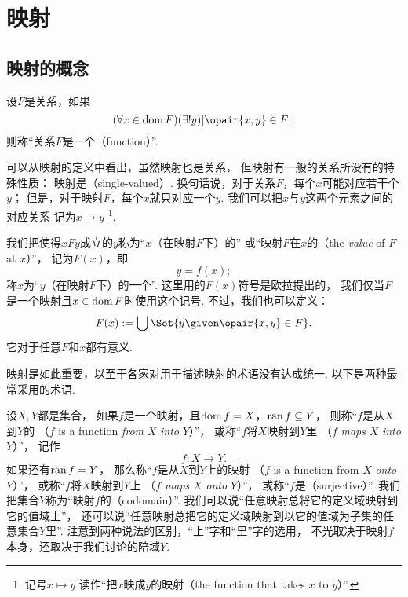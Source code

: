 \section{映射}
\subsection{映射的概念}
\begin{definition}
设\(F\)是关系，如果\[
	(\forall x \in \dom F)(\exists! y)[\opair{x,y} \in F],
\]
则称“关系\(F\)是一个（function）”.
\end{definition}
可以从映射的定义中看出，虽然映射也是关系，
但映射有一般的关系所没有的特殊性质：
映射是（single-valued）.
换句话说，对于关系\(F\)，每个\(x\)可能对应若干个\(y\)；
但是，对于映射\(F\)，每个\(x\)就只对应一个\(y\).
我们可以把\(x\)与\(y\)这两个元素之间的对应关系
记为\(x \mapsto y\) \footnote{
	记号\(x \mapsto y\)
	读作“把\(x\)映成\(y\)的映射（the function that takes \(x\) to \(y\)）”.
}.

我们把使得\(xFy\)成立的\(y\)称为“\(x\)（在映射\(F\)下）的”
或“映射\(F\)在\(x\)的（the \emph{value} of \(F\) at \(x\)）”，
记为\(F(x)\)，即\[
	y = f(x);
\]
称\(x\)为“\(y\)（在映射\(F\)下）的一个”.
这里用的\(F(x)\)符号是欧拉提出的，
我们仅当\(F\)是一个映射且\(x\in\operatorname{dom} F\)时使用这个记号.
不过，我们也可以定义：\[
	F(x) \defeq \bigcup\Set{ y \given \opair{x,y} \in F }.
\]
它对于任意\(F\)和\(x\)都有意义.

映射是如此重要，以至于各家对用于描述映射的术语没有达成统一.
以下是两种最常采用的术语.

设\(X,Y\)都是集合，
如果\(f\)是一个映射，且\(\operatorname{dom} f = X\)，\(\operatorname{ran} f \subseteq Y\)，
则称“\(f\)是从\(X\)到\(Y\)的%
（\(f\) is a function \emph{from} \(X\) \emph{into} \(Y\)）”，
或称“\(f\)将\(X\)映射到\(Y\)里%
（\(f\) \emph{maps} \(X\) \emph{into} \(Y\)）”，
记作\[
	f\colon X \to Y.
\]
如果还有\(\operatorname{ran} f = Y\)，
那么称“\(f\)是从\(X\)到\(Y\)上的映射%
（\(f\) is a function from \(X\) \emph{onto} \(Y\)）”，
或称“\(f\)将\(X\)映射到\(Y\)上%
（\(f\) \emph{maps} \(X\) \emph{onto} \(Y\)）”，
或称“\(f\)是（surjective）”.
我们把集合\(Y\)称为“映射\(f\)的（codomain）”.
我们可以说“任意映射总将它的定义域映射到它的值域上”，
还可以说“任意映射总把它的定义域映射到以它的值域为子集的任意集合\(Y\)里”.
注意到两种说法的区别，“上”字和“里”字的选用，
不光取决于映射\(f\)本身，还取决于我们讨论的陪域\(Y\).

